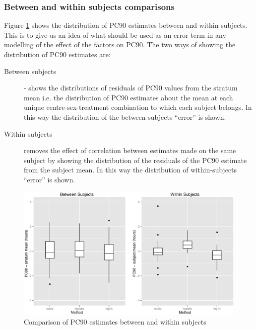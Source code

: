 \subsubsection*{Between and within subjects comparisons}
Figure \ref{methodsbysubject} shows the distribution of PC90 estimates between and within subjects. This is to give us an idea of what should be used as an error term in any modelling of the effect of the factors on PC90. The two ways of showing the distribution of PC90 estimates are:
\begin{description}
\item[Between subjects] - shows the distributions of residuals of PC90 values from the stratum mean i.e. the distribution of PC90 estimates about the mean at each unique centre-sex-treatment combination to which each subject belongs. In this way the distribution of the between-subjects ``error'' is shown.
\item[Within subjects] removes the effect of correlation between estimates made on the same subject by showing the distribution of the residuals of the PC90 estimate from the subject mean. In this way the distribution of within-subjects ``error'' is shown.
\end{description}
\begin{figure}[ht]
\includegraphics[width=150mm]{methodsbysubject.eps} 
\caption{Comparison of PC90 estimates between and within subjects}
\label{methodsbysubject}
\end{figure}

